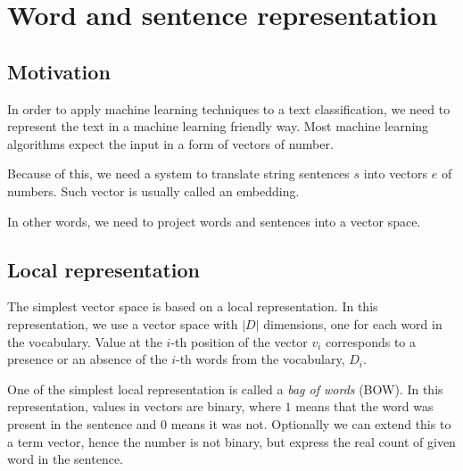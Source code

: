        \* %
        
    \section{Word and sentence representation}

        \subsection{Motivation}
        In order to apply machine learning techniques to a text classification, 
        we need to represent the text in a machine learning friendly way.
        Most machine learning algorithms expect the  input in a form of vectors of number. 
        
        Because of this, we need a system to translate string sentences $s$ into vectors $e$ of numbers. 
        Such vector is usually called an embedding. 
        
        In  other words, we need to project words and sentences into a vector space.
        
        \* %
        
        \subsection{Local representation}
        
        The simplest vector space is based on a local representation.
        In this representation, we use a vector space with $|D|$ dimensions, one for each word in the vocabulary.
        Value at the $i$-th position of the vector $v_i$ corresponds to a presence or an absence of the $i$-th words from the vocabulary, $D_i$.
        
        One of the simplest local representation is called a \textit{bag of words} (BOW). 
        In this representation, values in vectors are binary, where $1$ means that the word was present in the sentence and $0$ means it was not.
        Optionally we can extend this to a term vector, hence the number is not binary, but express the real count of given word in the sentence.
        
